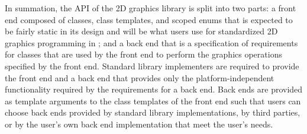 \pnum
In summation, the API of the 2D graphics library is split into two parts: a front end composed of classes, class templates, and scoped enums that is expected to be fairly static in its design and will be what users use for standardized 2D graphics programming in \Cpp; and a back end that is a specification of requirements for classes that are used by the front end to perform the graphics operations specified by the front end. Standard library implementers are required to provide the front end and a back end that provides only the platform-independent functionality required by the requirements for a back end. Back ends are provided as template arguments to the class templates of the front end such that users can choose back ends provided by standard library implementations, by third parties, or by the user's own back end implementation that meet the user's needs.